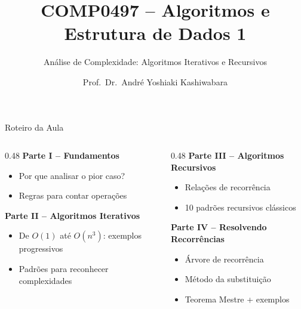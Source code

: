 \documentclass[aspectratio=169]{beamer}
\title{COMP0497 -- Algoritmos e Estrutura de Dados 1}
\subtitle{Análise de Complexidade: Algoritmos Iterativos e Recursivos}
\author{Prof.\ Dr.\ André Yoshiaki Kashiwabara}
\institute{DCOMP -- Universidade Federal de Sergipe\\
\texttt{andreyoshiaki@dcomp.ufs.br}}
\date{}
\begin{document}
\begin{frame}[plain]
    \titlepage
\end{frame}

\begin{frame}{Roteiro da Aula}
    \begin{columns}[T]
    \begin{column}{0.48\textwidth}
        \textbf{Parte I -- Fundamentos}
        \begin{itemize}
            \item Por que analisar o pior caso?
            \item Regras para contar operações
        \end{itemize}
        
        \vspace{0.4cm}
        \textbf{Parte II -- Algoritmos Iterativos}
        \begin{itemize}
            \item De $O(1)$ até $O(n^3)$: exemplos progressivos
            \item Padrões para reconhecer complexidades
        \end{itemize}
    \end{column}
    \begin{column}{0.48\textwidth}
        \textbf{Parte III -- Algoritmos Recursivos}
        \begin{itemize}
            \item Relações de recorrência
            \item 10 padrões recursivos clássicos
        \end{itemize}
        
        \vspace{0.4cm}
        \textbf{Parte IV -- Resolvendo Recorrências}
        \begin{itemize}
            \item Árvore de recorrência
            \item Método da substituição
            \item Teorema Mestre + exemplos
        \end{itemize}
    \end{column}
    \end{columns}
\end{frame}
\end{document}
